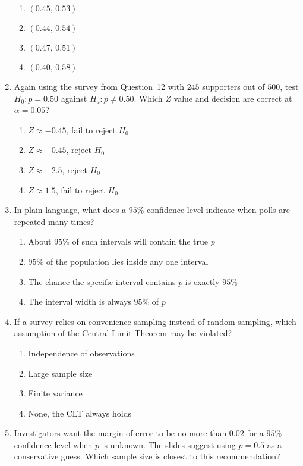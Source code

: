\documentclass{article}
\begin{document}
\begin{enumerate}
\begin{enumerate}[label=(\Alph*)]
  \item $(0.45,\,0.53)$
  \item $(0.44,\,0.54)$
  \item $(0.47,\,0.51)$
  \item $(0.40,\,0.58)$
  \end{enumerate}
\item Again using the survey from Question~12 with $245$ supporters out of $500$, test $H_0:p=0.50$ against $H_a:p\ne0.50$. Which $Z$ value and decision are correct at $\alpha=0.05$?
  \begin{enumerate}[label=(\Alph*)]
  \item $Z\approx-0.45$, fail to reject $H_0$
  \item $Z\approx-0.45$, reject $H_0$
  \item $Z\approx-2.5$, reject $H_0$
  \item $Z\approx1.5$, fail to reject $H_0$
  \end{enumerate}
\item In plain language, what does a $95\%$ confidence level indicate when polls are repeated many times?
  \begin{enumerate}[label=(\Alph*)]
  \item About $95\%$ of such intervals will contain the true $p$
  \item $95\%$ of the population lies inside any one interval
  \item The chance the specific interval contains $p$ is exactly $95\%$
  \item The interval width is always $95\%$ of $p$
  \end{enumerate}
\item If a survey relies on convenience sampling instead of random sampling, which assumption of the Central Limit Theorem may be violated?
  \begin{enumerate}[label=(\Alph*)]
  \item Independence of observations
  \item Large sample size
  \item Finite variance
  \item None, the CLT always holds
  \end{enumerate}
\item Investigators want the margin of error to be no more than $0.02$ for a $95\%$ confidence level when $p$ is unknown. The slides suggest using $p=0.5$ as a conservative guess. Which sample size is closest to this recommendation?
  \begin{enumerate}[label=(\Alph*)]

\end{enumerate}
\end{enumerate}
\end{document}
